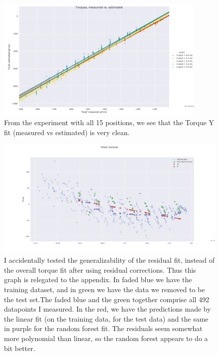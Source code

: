 \documentclass[preprint,12pt,3p]{elsarticle}
\begin{document}
\begin{figure}[H]
\centering
            \includegraphics[width=0.9\textwidth]{images/round1/TorqY_Colors_X.png}%
            \caption{From the experiment with all 15 positions, we see that the Torque Y fit
            (measured vs estimated) is very clean.}
            \label{fig:yX}
\end{figure}


\begin{figure}[H]
\centering
\includegraphics[width=1\textwidth]{images/round1/generalize_residfit.png}
\caption{I accidentally tested the generalizability of the residual fit, instead of the overall
torque fit after using residual corrections. Thus this graph is relegated to the appendix. In faded
blue we have the training dataset, and in green we have the data we removed to be the test set.The
faded blue and the green together comprise all 492 datapoints I measured. In the red, we have the
predictions made by the linear fit (on the training data, for the test data) and the same in purple
for the random forest fit. The residuals seem somewhat more polynomial than linear, so the random
forest appears to do a bit better. }
\label{fig:general}
\end{figure}
\end{document}
